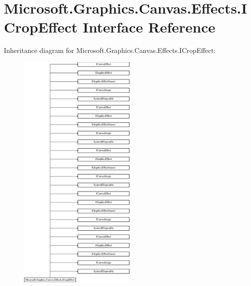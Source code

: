 \hypertarget{interface_microsoft_1_1_graphics_1_1_canvas_1_1_effects_1_1_i_crop_effect}{}\section{Microsoft.\+Graphics.\+Canvas.\+Effects.\+I\+Crop\+Effect Interface Reference}
\label{interface_microsoft_1_1_graphics_1_1_canvas_1_1_effects_1_1_i_crop_effect}
Inheritance diagram for Microsoft.\+Graphics.\+Canvas.\+Effects.\+I\+Crop\+Effect\+:\begin{figure}[H]
\begin{center}
\leavevmode
\includegraphics[height=12.000000cm]{interface_microsoft_1_1_graphics_1_1_canvas_1_1_effects_1_1_i_crop_effect}
\end{center}
\end{figure}
